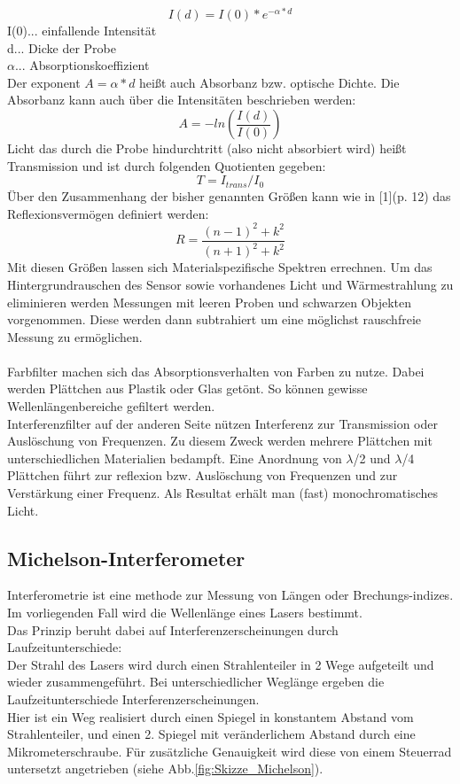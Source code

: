 \documentclass[12pt,a4paper]{article}
\begin{document}
\begin{multicols}{2}
$$I(d) = I(0) * e^{-\alpha *d}$$
I(0)... einfallende Intensität\\
d... Dicke der Probe\\
$\alpha$... Absorptionskoeffizient\\
Der exponent $A = \alpha * d$ heißt auch Absorbanz bzw. optische Dichte. Die Absorbanz kann auch über die Intensitäten beschrieben werden:
$$A = - ln\left( \frac{I(d)}{I(0)} \right)$$
Licht das durch die Probe hindurchtritt (also nicht absorbiert wird) heißt Transmission und ist durch folgenden Quotienten gegeben:\\
$$T = I_{trans}/I_0$$
Über den Zusammenhang der bisher genannten Größen kann wie in [1](p. 12) das Reflexionsvermögen definiert werden:
$$R = \frac{(n-1)^2 + k^2}{(n+1)^2 + k^2}$$
Mit diesen Größen lassen sich Materialspezifische Spektren errechnen. Um das Hintergrundrauschen des Sensor sowie vorhandenes Licht und Wärmestrahlung zu eliminieren werden Messungen mit leeren Proben und schwarzen Objekten vorgenommen. Diese werden dann subtrahiert um eine möglichst rauschfreie Messung zu ermöglichen.\\
\\
Farbfilter machen sich das Absorptionsverhalten von Farben zu nutze. Dabei werden Plättchen aus Plastik oder Glas getönt. So können gewisse Wellenlängenbereiche gefiltert werden.\\
Interferenzfilter auf der anderen Seite nützen Interferenz zur Transmission oder Auslöschung von Frequenzen. Zu diesem Zweck werden mehrere Plättchen mit unterschiedlichen Materialien bedampft. Eine Anordnung von $\lambda$/2 und $\lambda$/4 Plättchen führt zur reflexion bzw. Auslöschung von Frequenzen und zur Verstärkung einer Frequenz. Als Resultat erhält man (fast) monochromatisches Licht.

\subsection{Michelson-Interferometer}

Interferometrie ist eine methode zur Messung von Längen oder Brechungs-indizes.\\
Im vorliegenden Fall wird die Wellenlänge eines Lasers bestimmt.\\
Das Prinzip beruht dabei auf Interferenzerscheinungen durch Laufzeitunterschiede:\\
Der Strahl des Lasers wird durch einen Strahlenteiler in 2 Wege aufgeteilt und wieder zusammengeführt. Bei unterschiedlicher Weglänge ergeben die Laufzeitunterschiede Interferenzerscheinungen.\\
Hier ist ein Weg realisiert durch einen Spiegel in konstantem Abstand vom Strahlenteiler, und einen 2. Spiegel mit veränderlichem Abstand durch eine Mikrometerschraube. Für zusätzliche Genauigkeit wird diese von einem Steuerrad untersetzt angetrieben (siehe Abb.\ref{fig:Skizze_Michelson}).


\end{multicols}
\end{document}

